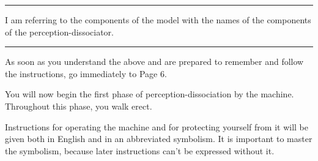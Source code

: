 \plainbreak{2}

I am referring to the components of the model with the names of the 
components of the perception-dissociator. 

\plainbreak{2}

As soon as you understand the above and are prepared to remember 
and follow the instructions, go immediately to Page 6. 

\clearpage


\clearpage

You will now begin the first phase of perception-dissociation by the 
machine. Throughout this phase, you walk erect. 

Instructions for operating the machine and for protecting yourself from 
it will be given both in English and in an abbreviated symbolism. It is 
important to master the symbolism, because later instructions can't be 
expressed without it. 

